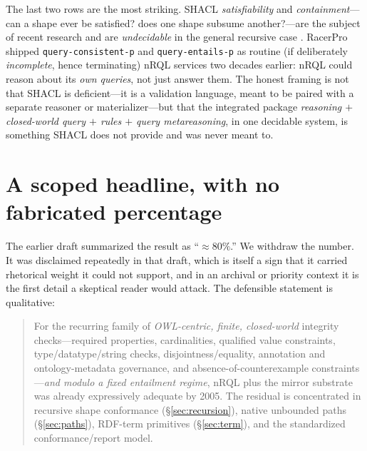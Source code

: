 \documentclass[11pt,letterpaper]{article}
\theoremstyle{definition}
\newcommand{\nrql}{nRQL}
\newcommand{\racer}{RacerPro}
\newcommand{\shacl}{SHACL}
\newcommand{\rdf}{RDF}
\begin{document}
The last two rows are the most striking. \shacl{} \emph{satisfiability} and \emph{containment}---can a shape ever be satisfied? does one shape subsume another?---are the subject of recent research and are \emph{undecidable} in the general recursive case \cite{satcont}. \racer{} shipped \texttt{query-consistent-p} and \texttt{query-entails-p} as routine (if deliberately \emph{incomplete}, hence terminating) nRQL services two decades earlier: nRQL could reason about its \emph{own queries}, not just answer them. The honest framing is not that \shacl{} is deficient---it is a validation language, meant to be paired with a separate reasoner or materializer---but that the integrated package \emph{reasoning $+$ closed-world query $+$ rules $+$ query metareasoning}, in one decidable system, is something \shacl{} does not provide and was never meant to.

\section{A scoped headline, with no fabricated percentage}\label{sec:headline}

The earlier draft summarized the result as ``$\approx 80\%$.'' We withdraw the number. It was disclaimed repeatedly in that draft, which is itself a sign that it carried rhetorical weight it could not support, and in an archival or priority context it is the first detail a skeptical reader would attack. The defensible statement is qualitative:

\begin{quote}
For the recurring family of \emph{OWL-centric, finite, closed-world} integrity checks---required properties, cardinalities, qualified value constraints, type/datatype/string checks, disjointness/equality, annotation and ontology-metadata governance, and absence-of-counterexample constraints---\emph{and modulo a fixed entailment regime}, \nrql{} plus the mirror substrate was already expressively adequate by 2005. The residual is concentrated in recursive shape conformance (\S\ref{sec:recursion}), native unbounded paths (\S\ref{sec:paths}), \rdf{}-term primitives (\S\ref{sec:term}), and the standardized conformance/report model.
\end{quote}
\end{document}
